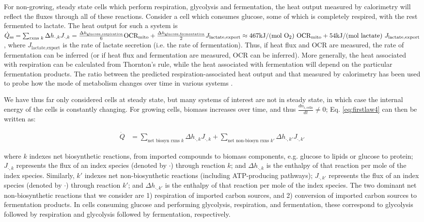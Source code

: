\documentclass{compactarticle}
\begin{document}
For non-growing, steady state cells which perform respiration, glycolysis and fermentation, the heat output measured by calorimetry will reflect the fluxes through all of these reactions. Consider a cell which consumes glucose, some of which is completely respired, with the rest fermented to lactate. The heat output for such a system is $\dot{Q}_\text{ss} = \sum_{\text{rxns } k} \Delta h_{\cdot,k} J_{\cdot,k} = \frac{\Delta h_\text{glucose,respiration}}{6}   \text{OCR}_\text{mito} + \frac{\Delta h_\text{glucose,fermentation}}{2}   J_\text{lactate,export} \approx 467 \text{kJ/(mol } \ce{O2} ) \text{ OCR}_\text{mito}  + 54 \text{kJ/(mol lactate) } J_\text{lactate,export}$, where $J_\text{lactate,export}$ is the rate of lactate secretion (i.e. the rate of fermentation). Thus, if heat flux and OCR are measured, the rate of fermentation can be inferred (or if heat flux and fermentation are measured, OCR can be inferred). More generally, the heat associated with respiration can be calculated from Thornton's rule, while the heat associated with fermentation will depend on the particular fermentation products. The ratio between the predicted respiration-associated heat output and that measured by calorimetry has been used to probe how the mode of metabolism changes over time in various systems \cite{hansen_use_2004,kemp_calorimetric_1991,lerchner_direct_2019}. 

We have thus far only considered cells at steady state, but many systems of interest are not in steady state, in which case the internal energy of the cells is constantly changing. For growing cells, biomass increases over time, and thus $\frac{dn_{i,\text{cells}}}{dt} \neq 0$; Eq. \ref{eq:firstlaw4} can then be written as:
 
\begin{align}
    \dot{Q} &= \sum_{\text{net biosyn rxns }k}  \Delta h_{\cdot,k} J_{\cdot,k} + \sum_{\text{net non-biosyn rxns }k'}  \Delta h_{\cdot,k'} J_{\cdot,k'}
    \label{eq:firstlaw8}
\end{align}

\noindent where $k$ indexes net biosynthetic reactions, from imported compounds to biomass components, e.g. glucose to lipids or glucose to protein; $ J_{\cdot,k} $ represents the flux of an index species (denoted by $ \cdot $) through reaction $ k $; and $ \Delta h_{\cdot,k} $ is the enthalpy of that reaction per mole of the index species. Similarly, $k'$ indexes net non-biosynthetic reactions (including ATP-producing pathways); $ J_{\cdot,k'} $ represents the flux of an index species (denoted by $ \cdot $) through reaction $ k' $; and $ \Delta h_{\cdot,k'} $ is the enthalpy of that reaction per mole of the index species. The two dominant net non-biosynthetic reactions that we consider are 1) respiration of imported carbon sources, and 2) conversion of imported carbon sources to fermentation products. In cells consuming glucose and performing glycolysis, respiration, and fermentation, these correspond to glycolysis followed by respiration and glycolysis followed by fermentation, respectively.
 
\end{document}
